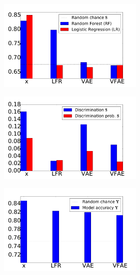 \begin{figure}[ht]
   \centering
   \begin{subfigure}{\linewidth}
  \begin{subfigure}{.329\textwidth}
    \centering
        \includegraphics[width=1.1\linewidth]{adult_s.pdf}
  \end{subfigure} %
  \begin{subfigure}{.329\textwidth}
    \centering
        \includegraphics[width=1.1\linewidth]{adult_discr.pdf}
  \end{subfigure} %
  \begin{subfigure}{.329\textwidth}
    \centering
        \includegraphics[width=1.1\linewidth]{adult_y.pdf}

\end{subfigure}
\end{subfigure}
\end{figure}
